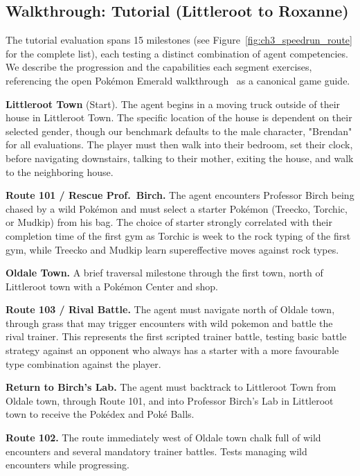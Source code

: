 \subsection{Walkthrough: Tutorial (Littleroot to Roxanne)}\label{sec:appendix_tutorial_walkthrough}

The tutorial evaluation spans 15 milestones (see Figure~\ref{fig:ch3_speedrun_route} for the complete list), each testing a distinct combination of agent competencies. We describe the progression and the capabilities each segment exercises, referencing the open Pok\'{e}mon Emerald walkthrough~\citep{bulbapedia2025walkthrough} as a canonical game guide.

\textbf{Littleroot Town} (Start). The agent begins in a moving truck outside of their house in Littleroot Town. The specific location of the house is dependent on their selected gender, though our benchmark defaults to the male character, "Brendan" for all evaluations. The player must then walk into their bedroom, set their clock, before navigating downstairs, talking to their mother, exiting the house, and walk to the neighboring house.

\textbf{Route 101 / Rescue Prof.\ Birch.} The agent encounters Professor Birch being chased by a wild Pok\'{e}mon and must select a starter Pok\'{e}mon (Treecko, Torchic, or Mudkip) from his bag. The choice of starter strongly correlated with their completion time of the first gym as Torchic is week to the rock typing of the first gym, while Treecko and Mudkip learn supereffective moves against rock types.

\textbf{Oldale Town.} A brief traversal milestone through the first town, north of Littleroot town with a Pok\'{e}mon Center and shop.

\textbf{Route 103 / Rival Battle.} The agent must navigate north of Oldale town, through grass that may trigger encounters with wild pokemon and battle the rival trainer. This represents the first scripted trainer battle, testing basic battle strategy against an opponent who always has a starter with a more favourable type combination against the player.

\textbf{Return to Birch's Lab.} The agent must backtrack to Littleroot Town from Oldale town, through Route 101, and into Professor Birch's Lab in Littleroot town to receive the Pok\'{e}dex and Pok\'{e} Balls. 

\textbf{Route 102.} The route immediately west of Oldale town chalk full of wild encounters and several mandatory trainer battles. Tests managing wild encounters while progressing.

